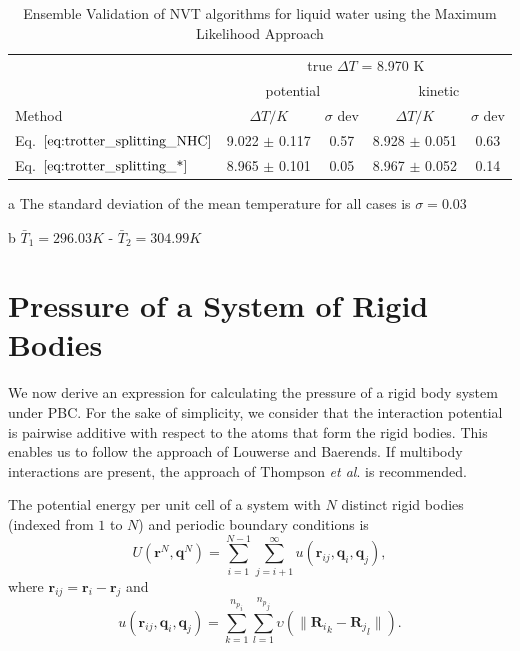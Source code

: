 \documentclass[aip,jcp,reprint,amsmath,amssymb]{revtex4-1}
\newcommand{\vt}[1]{\boldsymbol{\mathbf{#1}}}           %
\begin{document}
\begingroup
\squeezetable
\begin{table}
\setlength{\tabcolsep}{7pt}
\begin{threeparttable}
\caption{Ensemble Validation of NVT algorithms for liquid water using the Maximum Likelihood Approach  }
\label{table:ensemblevalidation}
\centering %
\begin{tabular}{|l c  c  c  c |}  
\hline
 & \multicolumn{4}{c|}{true $\Delta T$ = 8.970 K}\\
\cline{2-5}
  & \multicolumn{2}{c}{potential} & \multicolumn{2}{c|}{kinetic}\\
\hline
Method  &$\Delta T/K$ &$\sigma$ dev &$\Delta T/K$&$\sigma$ dev\\
\hline %
 Eq.~$\ref{eq:trotter_splitting_NHC}$   & 9.022 $\pm$ 0.117 & 0.57 & 8.928 $\pm$ 0.051 & 0.63 \\
 Eq.~$\ref{eq:trotter_splitting_*}$   & 8.965 $\pm$ 0.101 & 0.05 & 8.967 $\pm$ 0.052 & 0.14\\
  \hline
\end{tabular}
\begin{tablenotes}
\item[a] The standard deviation of the mean temperature for all cases is $\sigma = 0.03$
\item[b]$\bar{T}_1 = 296.03 K $  - $\bar{T}_2 = 304.99 K$
\end{tablenotes}
\end{threeparttable}
\end{table}
\endgroup


\section{Pressure of a System of Rigid Bodies}
\label{sec:pressure}
We now derive an expression for calculating the pressure of a rigid body system under PBC. For the sake of simplicity, we consider that the interaction potential is pairwise additive with respect to the atoms that form the rigid bodies. This enables us to follow the approach of Louwerse and Baerends.\cite{Louwerse2006} If multibody interactions are present, the approach of Thompson \textit{et al}.\cite{Thompson2009} is recommended.

The potential energy per unit cell of a system with $N$ distinct rigid bodies (indexed from $1$ to $N$) and periodic boundary conditions is
\begin{equation}
\label{eq:U_pairwise_pbc}
U({\vt r}^N, {\vt q}^N) = \sum_{i=1}^{N-1} \sum_{j=i+1}^{\infty} u({\vt r}_{ij},{\vt q}_i,{\vt q}_j),
\end{equation}
where ${\vt r}_{ij} = {\vt r}_i - {\vt r}_j$ and
\begin{equation}
\label{eq:u_rigid_body_pair}
u({\vt r}_{ij},{\vt q}_i,{\vt q}_j) = \sum_{k=1}^{{n_p}_i} \sum_{l=1}^{{n_p}_j} \upsilon \left( \|{{\vt R}_i}_k - {{\vt R}_j}_l\| \right).
\end{equation}
\end{document}
